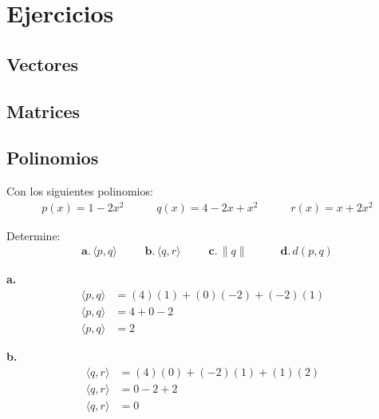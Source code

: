 \documentclass{article}
\begin{document}
\section{Ejercicios}

    \subsection{Vectores}



    \subsection{Matrices}



    \subsection{Polinomios}

        Con los siguientes polinomios:
        \begin{gather*}
            p(x)=1-2x^{2}\hspace{35pt}q(x)=4-2x+x^{2}\hspace{35pt}r(x)=x+2x^{2}
        \end{gather*}

        Determine:
        \begin{gather*}
            \textbf{a.}\hspace{2pt}\langle p,q\rangle\hspace{30pt}\textbf{b.}\hspace{2pt}\langle q,r\rangle\hspace{30pt}\textbf{c.}\hspace{2pt}\parallel q\parallel\hspace{35pt}\textbf{d.}\hspace{2pt}d(p,q)
        \end{gather*}

        \textbf{a.}
            \begin{align*}
                \langle p,q\rangle&= (4)(1)+(0)(-2)+(-2)(1) & \\
                \langle p,q\rangle&= 4+0-2 & \\
                \langle p,q\rangle&= 2
            \end{align*}

        \textbf{b.}
            \begin{align*}
                \langle q,r\rangle&= (4)(0)+(-2)(1)+(1)(2) & \\
                \langle q,r\rangle&= 0-2+2 & \\
                \langle q,r\rangle&= 0
            \end{align*}
\end{document}
